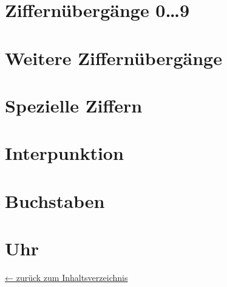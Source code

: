 \documentclass[a4paper,landscape]{article}
\begin{document}
\section{Ziffernübergänge 0…9}

\section{Weitere Ziffernübergänge}

\section{Spezielle Ziffern}

\section{Interpunktion}
\showtransition{:}{:}

\section{Buchstaben}


\newpage
\section{Uhr}

\showclocks

\hspace*{-1ex}

\bigskip
\hfill \hyperref[inhalt]{← zurück zum Inhaltsverzeichnis}
\end{document}

